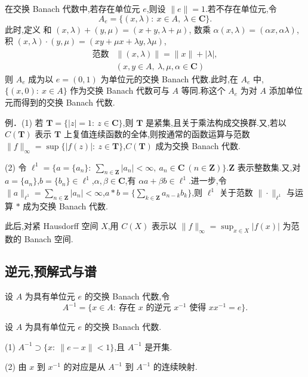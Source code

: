 在交换 Banach 代数中,若存在单位元 $e$,则设 $\|e\| = 1$.若不存在单位元,令
\begin{equation*}
A_{e} = \{(x, \lambda):\ x \in A,\ \lambda \in \mathbf{C}\}.
\end{equation*}
此时,定义
和 $(x, \lambda) + (y, \mu) = (x + y, \lambda + \mu)$,
数乘 $\alpha(x, \lambda) = (\alpha x, \alpha\lambda)$,
积 $(x, \lambda) \cdot (y, \mu) = (xy + \mu x + \lambda y, \lambda\mu)$,
\begin{align*}
\text{范数} & \|(x, \lambda)\| = \|x\| + |\lambda|, \\
& (x, y \in A,\ \lambda, \mu, \alpha \in \mathbf{C})
\end{align*}
则 $A_{e}$ 成为以 $e = (0, 1)$ 为单位元的交换 Banach 代数.此时,在 $A_{e}$ 中,$\{(x, 0):\ x \in A\}$ 作为交换 Banach 代数可与 $A$ 等同.称这个 $A_{e}$ 为对 $A$ 添加单位元而得到的交换 Banach 代数.

例．(1) 若 $\mathbf{T} = \{|z| = 1:\ z \in \mathbf{C}\}$,则 $\mathbf{T}$ 是紧集,且关于乘法构成交换群.又,若以 $C(\mathbf{T})$ 表示 $\mathbf{T}$ 上复值连续函数的全体,则按通常的函数运算与范数 $\|f\|_{\infty} = \sup\{|f(z)|:\ z \in \mathbf{T}\}$,$C(\mathbf{T})$ 成为交换 Banach 代数.

(2) 令 $\ell^{1} = \{a = \{a_{n}\}:\ \sum_{n \in \mathbf{Z}} |a_{n}| < \infty,\ a_{n} \in \mathbf{C}\ (n \in \mathbf{Z})\}$.$\mathbf{Z}$ 表示整数集.又,对 $a = \{a_{n}\}$,$b = \{b_{n}\} \in \ell^{1}$,$\alpha, \beta \in \mathbf{C}$,有 $\alpha a + \beta b \in \ell^{1}$.进一步,令 $\|a\|_{\ell^{1}} = \sum_{n \in \mathbf{Z}} |a_{n}| < \infty$,$a * b = \{\sum_{k \in \mathbf{Z}} a_{n-k} b_{k}\}$,则 $\ell^{1}$ 关于范数 $\|\cdot\|_{\ell^{1}}$ 与运算 $*$ 成为交换 Banach 代数.

此后,对紧 Hausdorff 空间 $X$,用 $C(X)$ 表示以 $\|f\|_{\infty} = \sup_{x \in X} |f(x)|$ 为范数的 Banach 空间.

\subsection{逆元,预解式与谱}\label{sec:3.1.2}

\begin{definition}\label{def:3.1.2}
设 $A$ 为具有单位元 $e$ 的交换 Banach 代数,令
\begin{equation*}
A^{-1} = \{x \in A:\ \text{存在 } x \text{ 的逆元 } x^{-1} \text{ 使得 } xx^{-1} = e\}.
\end{equation*}
\end{definition}

\begin{theorem}\label{thm:3.1.3}
设 $A$ 为具有单位元 $e$ 的交换 Banach 代数.

(1) $A^{-1} \supset \{x:\ \|e - x\| < 1\}$,且 $A^{-1}$ 是开集.

(2) 由 $x$ 到 $x^{-1}$ 的对应是从 $A^{-1}$ 到 $A^{-1}$ 的连续映射.
\end{theorem}

